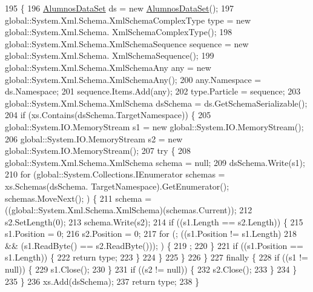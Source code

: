 \begin{DoxyCode}
195                                                                                                            
                             \{
196             \hyperlink{class_asistencias__wpf_1_1_alumnos_data_set_a2d47f7c2a65b0ef4a5f1d70feb28751c}{AlumnosDataSet} ds = \textcolor{keyword}{new} \hyperlink{class_asistencias__wpf_1_1_alumnos_data_set_a2d47f7c2a65b0ef4a5f1d70feb28751c}{AlumnosDataSet}();
197             global::System.Xml.Schema.XmlSchemaComplexType type = \textcolor{keyword}{new} global::System.Xml.Schema.
      XmlSchemaComplexType();
198             global::System.Xml.Schema.XmlSchemaSequence sequence = \textcolor{keyword}{new} global::System.Xml.Schema.
      XmlSchemaSequence();
199             global::System.Xml.Schema.XmlSchemaAny any = \textcolor{keyword}{new} global::System.Xml.Schema.XmlSchemaAny();
200             any.Namespace = ds.Namespace;
201             sequence.Items.Add(any);
202             type.Particle = sequence;
203             global::System.Xml.Schema.XmlSchema dsSchema = ds.GetSchemaSerializable();
204             \textcolor{keywordflow}{if} (xs.Contains(dsSchema.TargetNamespace)) \{
205                 global::System.IO.MemoryStream s1 = \textcolor{keyword}{new} global::System.IO.MemoryStream();
206                 global::System.IO.MemoryStream s2 = \textcolor{keyword}{new} global::System.IO.MemoryStream();
207                 \textcolor{keywordflow}{try} \{
208                     global::System.Xml.Schema.XmlSchema schema = null;
209                     dsSchema.Write(s1);
210                     \textcolor{keywordflow}{for} (global::System.Collections.IEnumerator schemas = xs.Schemas(dsSchema.
      TargetNamespace).GetEnumerator(); schemas.MoveNext(); ) \{
211                         schema = ((global::System.Xml.Schema.XmlSchema)(schemas.Current));
212                         s2.SetLength(0);
213                         schema.Write(s2);
214                         \textcolor{keywordflow}{if} ((s1.Length == s2.Length)) \{
215                             s1.Position = 0;
216                             s2.Position = 0;
217                             \textcolor{keywordflow}{for} (; ((s1.Position != s1.Length) 
218                                         && (s1.ReadByte() == s2.ReadByte())); ) \{
219                                 ;
220                             \}
221                             \textcolor{keywordflow}{if} ((s1.Position == s1.Length)) \{
222                                 \textcolor{keywordflow}{return} type;
223                             \}
224                         \}
225                     \}
226                 \}
227                 \textcolor{keywordflow}{finally} \{
228                     \textcolor{keywordflow}{if} ((s1 != null)) \{
229                         s1.Close();
230                     \}
231                     \textcolor{keywordflow}{if} ((s2 != null)) \{
232                         s2.Close();
233                     \}
234                 \}
235             \}
236             xs.Add(dsSchema);
237             \textcolor{keywordflow}{return} type;
238         \}
\end{DoxyCode}
